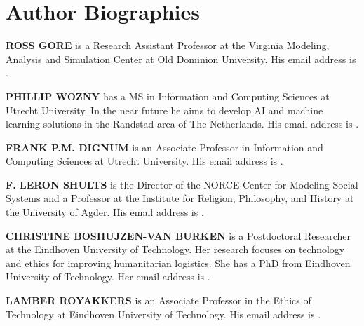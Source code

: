 \documentclass{scspaperproc}
\theoremstyle{scsthe}
\begin{document}
\section*{Author Biographies}

\textbf{\uppercase{ROSS GORE}} is a Research Assistant Professor at the Virginia Modeling, Analysis and Simulation Center at Old Dominion University. His email address is .

\textbf{\uppercase{PHILLIP WOZNY}} has a MS in Information and Computing Sciences at Utrecht University. In the near future he aims to develop AI and machine learning solutions in the Randstad area of The Netherlands. His email address is .

\textbf{\uppercase{FRANK P.M. DIGNUM}} is an Associate Professor in Information and Computing Sciences at Utrecht University. His email address is .

\textbf{\uppercase{F. LERON SHULTS}} is the Director of the NORCE Center for Modeling Social Systems and a Professor at the Institute for Religion, Philosophy, and History at the University of Agder. His email address is .

\textbf{\uppercase{CHRISTINE BOSHUJZEN-VAN BURKEN}} is a Postdoctoral Researcher at the Eindhoven University of Technology. Her research focuses on technology and ethics for improving humanitarian logistics. She has a PhD from Eindhoven University of Technology. Her email address is .

\textbf{\uppercase{LAMBER ROYAKKERS}} is an Associate Professor in the Ethics of Technology at Eindhoven University of Technology. His email address is .
\end{document}
